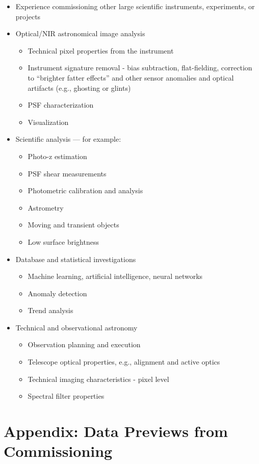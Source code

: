 \documentclass[SE,authoryear,toc,lsstdraft]{lsstdoc}
\begin{document}
\begin{itemize}
\item Experience commissioning other large scientific instruments, experiments, or projects
\item Optical/NIR astronomical image analysis
	\begin{itemize}
	\item Technical pixel properties from the instrument
	\item Instrument signature removal - bias subtraction, flat-fielding, correction to ``brighter fatter effects'' and other sensor anomalies and optical artifacts (e.g., ghosting or glints)
	\item PSF characterization
	\item Visualization
	\end{itemize}
\item Scientific analysis --- for example:
\begin{itemize}
	\item Photo-z estimation
	\item PSF shear measurements
	\item Photometric calibration and analysis
	\item Astrometry
	\item Moving and transient objects
	\item Low surface brightness
\end{itemize}
\item Database and statistical investigations
	\begin{itemize}
	\item Machine learning, artificial intelligence, neural networks
	\item Anomaly detection
	\item Trend analysis
\end{itemize}
\item Technical and observational astronomy
	\begin{itemize}
	\item Observation planning and execution
	\item Telescope optical properties, e.g., alignment and active optics
	\item Technical imaging characteristics - pixel level
	\item Spectral filter properties
	\end{itemize}
\end{itemize}

\appendix

\section{Appendix: Data Previews from Commissioning}
\label{data_previews}
\end{document}
